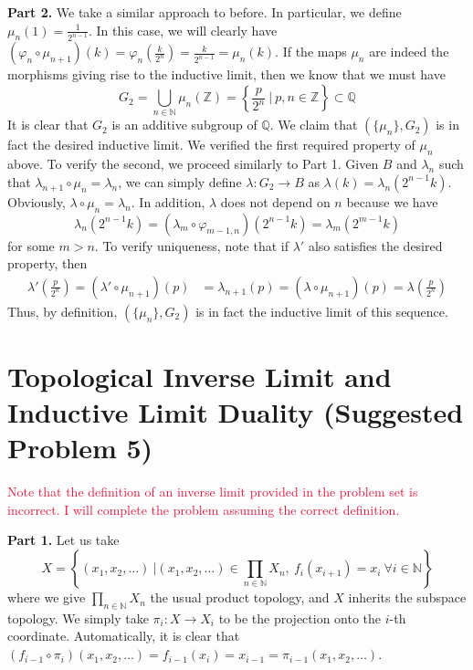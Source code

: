 \documentclass[aps,pra,showpacs,notitlepage,onecolumn,superscriptaddress,nofootinbib]{revtex4-1}
\newcommand{\pop}[1]{\textcolor{crimson}{#1}}
\newcommand{\hhrulefill}{\hspace{-1.0em}\hrulefill}
\theoremstyle{definition}
\begin{document}
\noindent \textbf{Part 2.} We take a similar approach to before. In particular, we define $\mu_n(1) = \frac{1}{2^{n - 1}}$. In this case, we will clearly have $(\varphi_n \circ \mu_{n + 1})(k) = \varphi_n\left( \frac{k}{2^{n}} \right) = \frac{k}{2^{n - 1}} = \mu_{n}(k)$.
If the maps $\mu_n$ are indeed the morphisms giving rise to the inductive limit, then we know that we must have
\begin{equation}
  G_2 = \displaystyle\bigcup_{n \in \mathbb{N}} \mu_n(\mathbb{Z}) =\left\{ \frac{p}{2^{n}} \ \Big| \ p, n \in \mathbb{Z} \right\} \subset \mathbb{Q}
\end{equation}
It is clear that $G_2$ is an additive subgroup of $\mathbb{Q}$. We claim that $(\{\mu_n\}, G_2)$ is in fact the desired inductive limit. We verified the first required property of $\mu_n$ above. To verify the second, we proceed similarly to Part 1.
Given $B$ and $\lambda_n$ such that $\lambda_{n + 1} \circ \mu_n = \lambda_n$, we can simply define $\lambda : G_2 \rightarrow B$ as
$\lambda(k) = \lambda_n(2^{n - 1} k)$. Obviously, $\lambda \circ \mu_n = \lambda_n$. In addition, $\lambda$ does not depend on $n$ because we have
\begin{equation}
  \lambda_n(2^{n - 1} k) = (\lambda_{m} \circ \varphi_{m - 1, n})(2^{n - 1} k) = \lambda_m(2^{m - 1} k)
\end{equation}
for some $m > n$. To verify uniqueness, note that if $\lambda'$ also satisfies the desired property, then
\begin{align}
  \lambda' \left( \frac{p}{2^n} \right) = (\lambda' \circ \mu_{n + 1}) \left( p \right) &= \lambda_{n + 1} \left( p \right) = (\lambda \circ \mu_{n + 1})(p) = \lambda \left( \frac{p}{2^n} \right)
\end{align}
Thus, by definition, $(\{\mu_n\}, G_2)$ is in fact the inductive limit of this sequence.

\hhrulefill

\section{Topological Inverse Limit and Inductive Limit Duality (Suggested Problem 5)}

\noindent \pop{Note that the definition of an inverse limit provided in the problem set is incorrect. I will complete the problem assuming the correct definition.}
\newline

\noindent \textbf{Part 1.} Let us take
$$X = \left\{ (x_1, x_2, \dots) \ \Big| (x_1, x_2, \dots) \in \prod_{n \in \mathbb{N}} X_n, \ f_i(x_{i + 1}) = x_i \ \forall i \in \mathbb{N} \right\}$$
where we give $\prod_{n \in \mathbb{N}} X_n$ the usual product topology, and $X$ inherits the subspace topology. We simply take $\pi_i : X \rightarrow X_i$
to be the projection onto the $i$-th coordinate. Automatically, it is clear that $(f_{i - 1} \circ \pi_i)(x_1, x_2, \dots) = f_{i - 1}(x_{i}) = x_{i - 1} = \pi_{i - 1}(x_1, x_2, \dots)$.
\end{document}
